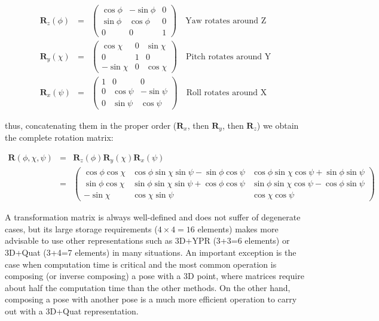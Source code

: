 \documentclass[a4paper,10pt]{report}
\begin{document}
\begin{eqnarray}
\mathbf{R}_z(\phi) &=& 
\left(
\begin{array}{ccc}
\cos \phi & -\sin \phi & 0 \\
\sin \phi & \cos \phi & 0 \\
0 & 0 & 1
\end{array}
\right) \quad \mathrm{\text{Yaw rotates around Z}} \\
\mathbf{R}_y(\chi) &= &
\left(
\begin{array}{ccc}
\cos \chi & 0 & \sin \chi \\
0 & 1 & 0 \\
-\sin \chi & 0 & \cos \chi
\end{array}
\right) \quad \mathrm{\text{Pitch rotates around Y}} \\
\mathbf{R}_x(\psi) &=& 
\left(
\begin{array}{ccc}
1 & 0 & 0 \\
0 & \cos \psi & -\sin \psi \\
0 & \sin \psi &  \cos \psi 
\end{array}
\right) \quad \mathrm{\text{Roll rotates around X}} 
\end{eqnarray}

\noindent thus, concatenating them in the proper order ($\mathbf{R}_x$, then $\mathbf{R}_y$, then $\mathbf{R}_z$)
we obtain the complete rotation matrix:

\begin{eqnarray}
\mathbf{R}(\phi,\chi,\psi) &=&  \mathbf{R}_z(\phi) \mathbf{R}_y(\chi) \mathbf{R}_x(\psi) 
\label{eq:mat_ypr} \\
&=& 
\left(
\begin{array}{ccc}
\cos \phi \cos \chi  & \cos \phi \sin \chi \sin \psi - \sin \phi \cos \psi   & \cos \phi \sin \chi \cos \psi + \sin \phi \sin \psi \\
\sin \phi \cos \chi  & \sin \phi \sin \chi \sin \psi + \cos \phi \cos \psi  &  \sin \phi \sin \chi \cos \psi - \cos \phi \sin \psi \\
-\sin \chi & \cos \chi \sin \psi  &  \cos \chi \cos \psi
\end{array}
\right) \nonumber
\end{eqnarray}

A transformation matrix is always well-defined and does not suffer of degenerate cases, but its large
storage requirements ($4\times 4=16$ elements) makes more advisable to use other representations such 
as 3D+YPR (3+3=6 elements) or 3D+Quat (3+4=7 elements) in many situations. 
An important exception is the case when computation time is critical and the most common operation 
is composing (or inverse composing) a pose with a 3D point, where matrices require about half the 
computation time than the other methods. On the other hand, composing a pose with another pose is 
a much more efficient operation to carry out with a 3D+Quat representation. 
\end{document}

